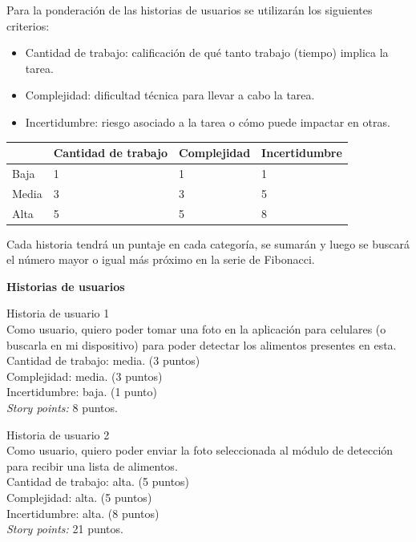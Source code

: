 \documentclass[
11pt, %
]{charter}
\begin{document}
Para la ponderación de las historias de usuarios se utilizarán los siguientes criterios:

\begin{itemize}
\item Cantidad de trabajo: calificación de qué tanto trabajo (tiempo) implica la tarea.
\item Complejidad: dificultad técnica para llevar a cabo la tarea.
\item Incertidumbre: riesgo asociado a la tarea o cómo puede impactar en otras. 
\end{itemize}

\begin{table}[H]
\begin{tabularx}{\linewidth}{@{}|l|X|X|l|@{}}
\hline
\rowcolor[HTML]{C0C0C0} 
	           & Cantidad de trabajo & Complejidad 	& Incertidumbre  \\ \hline
Baja       & 1     & 1	& 1      	\\ \hline
Media   & 3     & 3     	& 5 	\\ \hline
Alta    & 5      & 5 	& 8\\ \hline
\end{tabularx}
\end{table}


Cada historia tendrá un puntaje en cada categoría, se sumarán  y luego se buscará el número mayor o igual más próximo en la serie de Fibonacci.

\textbf{Historias de usuarios}

Historia de usuario 1 \\
Como usuario, quiero poder tomar una foto en la aplicación para celulares (o buscarla en mi dispositivo) para poder detectar los alimentos presentes en esta.\\
Cantidad de trabajo: media. (3 puntos)\\
Complejidad: media. (3 puntos)\\
Incertidumbre: baja. (1 punto)\\
\textit{Story points:} 8 puntos.

Historia de usuario 2 \\
Como usuario, quiero poder enviar la foto seleccionada al módulo de detección para recibir una lista de alimentos. \\
Cantidad de trabajo: alta. (5 puntos)\\
Complejidad: alta. (5 puntos)\\
Incertidumbre: alta. (8 puntos)\\
\textit{Story points:} 21 puntos.
\end{document}

